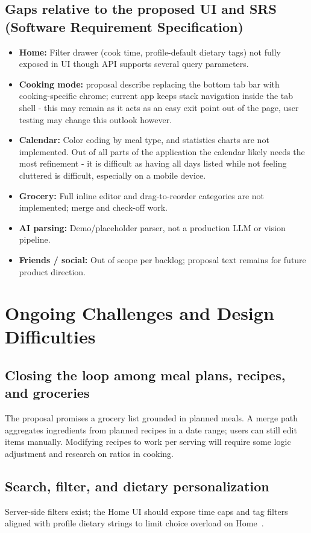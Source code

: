 \documentclass[conference]{IEEEtran}
\begin{document}
\subsection{Gaps relative to the proposed UI and SRS (Software Requirement Specification)} 
\begin{itemize}[leftmargin=*]
  \item \textbf{Home:} Filter drawer (cook time, profile-default dietary tags) not fully exposed in UI though API supports several query parameters.
  \item \textbf{Cooking mode:} proposal describe replacing the bottom tab bar with cooking-specific chrome; current app keeps stack navigation inside the tab shell - this may remain as it acts as an easy exit point out of the page, user testing may change this outlook however.
  \item \textbf{Calendar:} Color coding by meal type, and statistics charts are not implemented. Out of all parts of the application the calendar likely needs the most refinement - it is difficult as having all days listed while not feeling cluttered is difficult, especially on a mobile device.
  \item \textbf{Grocery:} Full inline editor and drag-to-reorder categories are not implemented; merge and check-off work.
  \item \textbf{AI parsing:} Demo/placeholder parser, not a production LLM or vision pipeline.
  \item \textbf{Friends / social:} Out of scope per backlog; proposal text remains for future product direction.
\end{itemize}

\section{Ongoing Challenges and Design Difficulties}
\subsection{Closing the loop among meal plans, recipes, and groceries}
The proposal promises a grocery list grounded in planned meals. A merge path aggregates ingredients from planned recipes in a date range; users can still edit items manually. Modifying recipes to work per serving will require some logic adjustment and research on ratios in cooking.

\subsection{Search, filter, and dietary personalization}
Server-side filters exist; the Home UI should expose time caps and tag filters aligned with profile dietary strings to limit choice overload on Home~\cite{hartson2012ux}.
\end{document}

